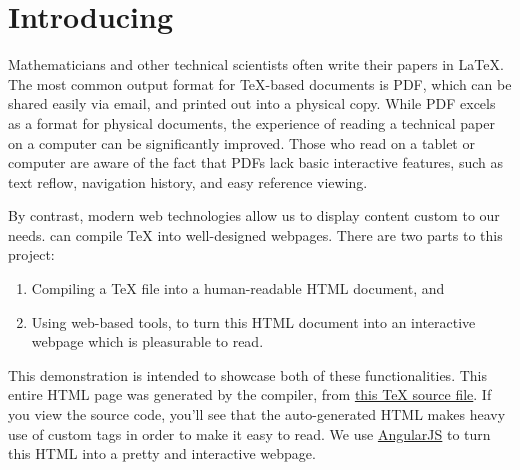 \documentclass[11pt]{article}
\begin{document}
\tableofcontents

\section{Introducing \DiscoTeX}
Mathematicians and other technical scientists often write their papers in \LaTeX.
The most common output format for \TeX{}-based documents is PDF, which can be shared easily via email, and printed out into a physical copy.
While PDF excels as a format for physical documents, the experience of reading a technical paper on a computer can be significantly improved.
Those who read on a tablet or computer are aware of the fact that PDFs lack basic interactive features, such as text reflow, navigation history, and easy reference viewing.

By contrast, modern web technologies allow us to display content custom to our needs.
\DiscoTeX{} can compile \TeX{} into well-designed webpages.
There are two parts to this project:
\begin{enumerate}
    \item Compiling a \TeX{} file into a human-readable HTML document, and
    \item Using web-based tools, to turn this HTML document into an interactive webpage which is pleasurable to read.
\end{enumerate}
This demonstration is intended to showcase both of these functionalities.
This entire HTML page was generated by the \DiscoTeX{} compiler, from \href{demo.tex}{this \TeX{} source file}.
If you view the source code, you'll see that the auto-generated HTML makes heavy use of custom tags in order to make it easy to read.
We use \href{https://angularjs.org/}{AngularJS} to turn this HTML into a pretty and interactive webpage.
\end{document}
